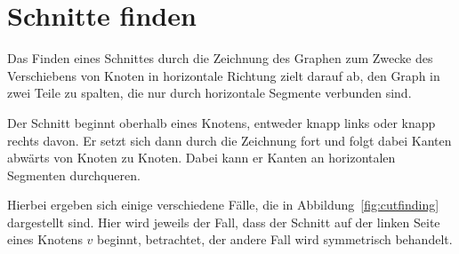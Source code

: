 \documentclass[a4paper]{scrreprt}
\theoremstyle{definition}
\begin{document}

\section{Schnitte finden}

Das Finden eines Schnittes durch die Zeichnung des Graphen zum Zwecke des Verschiebens von Knoten in horizontale Richtung zielt darauf ab, den Graph in zwei Teile zu spalten, die nur durch horizontale Segmente verbunden sind. 

Der Schnitt beginnt oberhalb eines Knotens, entweder knapp links oder knapp rechts davon. Er setzt sich dann durch die Zeichnung fort und folgt dabei Kanten abwärts von Knoten zu Knoten. Dabei kann er Kanten an horizontalen Segmenten durchqueren.

Hierbei ergeben sich einige verschiedene Fälle, die in Abbildung~\ref{fig:cutfinding} dargestellt sind. Hier wird jeweils der Fall, dass der Schnitt auf der linken Seite eines Knotens $v$ beginnt, betrachtet, der andere Fall wird symmetrisch behandelt. 
\end{document}
